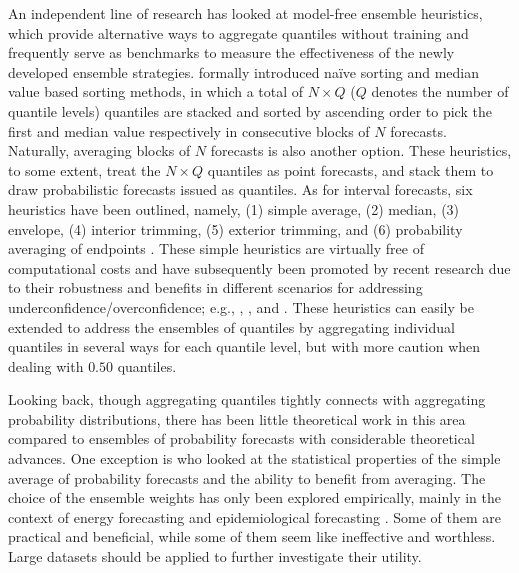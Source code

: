 \documentclass[11pt]{article}
\begin{document}
An independent line of research has looked at model-free ensemble heuristics, which provide alternative ways to aggregate quantiles without training and frequently serve as benchmarks to measure the effectiveness of the newly developed ensemble strategies. \cite{Wang2019-lx} formally introduced na\"{i}ve sorting and median value based sorting methods, in which a total of $N \times Q$ ($Q$ denotes the number of quantile levels) quantiles are stacked and sorted by ascending order to pick the first and median value respectively in consecutive blocks of $N$ forecasts. Naturally, averaging blocks of $N$ forecasts is also another option. These heuristics, to some extent, treat the $N \times Q$ quantiles as point forecasts, and stack them to draw probabilistic forecasts issued as quantiles. As for interval forecasts, six heuristics have been outlined, namely, (1) simple average, (2) median, (3) envelope, (4) interior trimming, (5) exterior trimming, and (6) probability averaging of endpoints \citep{Park2015-zn,Gaba2017-om}. These simple heuristics are virtually free of computational costs and have subsequently been promoted by recent research due to their robustness and benefits in different scenarios for addressing underconfidence/overconfidence; e.g., \cite{Smyl2019-av}, \cite{Petropoulos2020-fp}, and \cite{Grushka-Cockayne2020-qv}. These heuristics can easily be extended to address the ensembles of quantiles by aggregating individual quantiles in several ways for each quantile level, but with more caution when dealing with $0.50$ quantiles.


Looking back, though aggregating quantiles tightly connects with aggregating probability distributions, there has been little theoretical work in this area compared to ensembles of probability forecasts with considerable theoretical advances. One exception is \cite{Lichtendahl2013-rt} who looked at the statistical properties of the simple average of probability forecasts and the ability to benefit from averaging. The choice of the ensemble weights has only been explored empirically, mainly in the context of energy forecasting \citep[e.g.,][]{Wang2019-lx,Browell2020-pa} and epidemiological forecasting \citep[e.g.,][]{Brooks2020-sg,Ray2020-qg}. Some of them are practical and beneficial, while some of them seem like ineffective and worthless. Large datasets should be applied to further investigate their utility.
\end{document}
